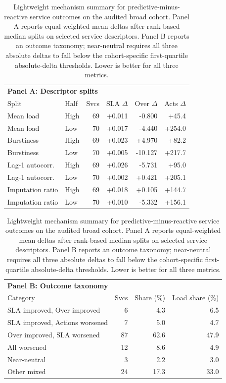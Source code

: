 \begin{table}[htbp]
  \centering
  \caption{Lightweight mechanism summary for predictive-minus-reactive service outcomes on the audited broad cohort. Panel A reports equal-weighted mean deltas after rank-based median splits on selected service descriptors. Panel B reports an outcome taxonomy; near-neutral requires all three absolute deltas to fall below the cohort-specific first-quartile absolute-delta thresholds. Lower is better for all three metrics.}
  \label{tab:service-policy-mechanism}
  \fontsize{7.3}{8.1}\selectfont
  \setlength{\tabcolsep}{2.2pt}
  \renewcommand{\arraystretch}{0.93}
  \begin{tabular}{@{}llrrrr@{}}
    \toprule
    \multicolumn{6}{l}{\textbf{Panel A: Descriptor splits}} \\
    Split & Half & Svcs & SLA $\Delta$ & Over $\Delta$ & Acts $\Delta$ \\
    \midrule
    Mean load & High & 69 & +0.011 & -0.800 & +45.4 \\
    Mean load & Low & 70 & +0.017 & -4.440 & +254.0 \\
    Burstiness & High & 69 & +0.023 & +4.970 & +82.2 \\
    Burstiness & Low & 70 & +0.005 & -10.127 & +217.7 \\
    Lag-1 autocorr. & High & 69 & +0.026 & -5.731 & +95.0 \\
    Lag-1 autocorr. & Low & 70 & +0.002 & +0.421 & +205.1 \\
    Imputation ratio & High & 69 & +0.018 & +0.105 & +144.7 \\
    Imputation ratio & Low & 70 & +0.010 & -5.332 & +156.1 \\
    \bottomrule
  \end{tabular}

  \vspace{0.45em}

  \begin{tabular}{@{}p{}rrr@{}}
    \toprule
    \multicolumn{4}{l}{\textbf{Panel B: Outcome taxonomy}} \\
    Category & Svcs & Share (\%) & Load share (\%) \\
    \midrule
    SLA improved, Over improved & 6 & 4.3 & 6.5 \\
    SLA improved, Actions worsened & 7 & 5.0 & 4.7 \\
    Over improved, SLA worsened & 87 & 62.6 & 47.9 \\
    All worsened & 12 & 8.6 & 4.9 \\
    Near-neutral & 3 & 2.2 & 3.0 \\
    Other mixed & 24 & 17.3 & 33.0 \\
    \bottomrule
  \end{tabular}
\end{table}

